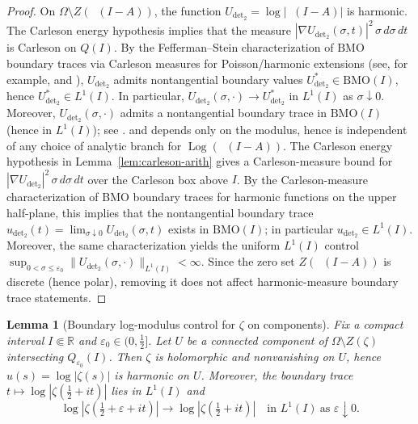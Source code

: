 \documentclass[11pt]{amsart}
\newtheorem{lemma}[theorem]{Lemma}
\theoremstyle{definition}
\theoremstyle{remark}
\DeclareMathOperator{\dettwo}{det_2}
\begin{document}
\begin{proof}
On $\Omega\setminus Z(\dettwo(I-A))$, the function $U_{\det_2}=\log|\dettwo(I-A)|$ is harmonic.
The Carleson energy hypothesis implies that the measure $|\nabla U_{\det_2}(\sigma,t)|^2\,\sigma\,d\sigma\,dt$ is Carleson on $Q(I)$.
By the Fefferman--Stein characterization of $\mathrm{BMO}$ boundary traces via Carleson measures for Poisson/harmonic extensions (see, for example, \cite[Ch.~IV, Thm.~3, p.~159]{SteinHA} and \cite[Ch.~VI, Thm.~3.4]{GarnettBAF}), $U_{\det_2}$ admits nontangential boundary values $U_{\det_2}^*\in\mathrm{BMO}(I)$, hence $U_{\det_2}^*\in L^1(I)$.
In particular, $U_{\det_2}(\sigma,\cdot)\to U_{\det_2}^*$ in $L^1(I)$ as $\sigma\downarrow 0$.
Moreover, $U_{\det_2}(\sigma,\cdot)$ admits a nontangential boundary trace in $\mathrm{BMO}(I)$ (hence in $L^1(I)$); see \cite{SteinHA,GarnettBAF}.
 and depends only on the modulus, hence is independent of any choice of analytic branch for $\operatorname{Log}(\dettwo(I-A))$.
The Carleson energy hypothesis in Lemma~\ref{lem:carleson-arith} gives a Carleson-measure bound for $|\nabla U_{\det_2}|^2\,\sigma\,d\sigma\,dt$ over the Carleson box above $I$.
By the Carleson-measure characterization of BMO boundary traces for harmonic functions on the upper half-plane, this implies that the nontangential boundary trace
$u_{\det_2}(t)=\lim_{\sigma\downarrow 0}U_{\det_2}(\sigma,t)$ exists in $\mathrm{BMO}(I)$; in particular $u_{\det_2}\in L^1(I)$.
Moreover, the same characterization yields the uniform $L^1(I)$ control
\(
\sup_{0<\sigma\le\varepsilon_0}\|U_{\det_2}(\sigma,\cdot)\|_{L^1(I)}<\infty.
\)
Since the zero set $Z(\dettwo(I-A))$ is discrete (hence polar), removing it does not affect harmonic-measure boundary trace statements.
\end{proof}
\begin{lemma}[Boundary log-modulus control for $\zeta$ on components]\label{lem:zeta-logL1-components}
Fix a compact interval $I\Subset\mathbb R$ and $\varepsilon_0\in(0,\tfrac12]$.
Let $U$ be a connected component of $\Omega\setminus Z(\zeta)$ intersecting $Q_{\varepsilon_0}(I)$.
Then $\zeta$ is holomorphic and nonvanishing on $U$, hence $u(s)=\log|\zeta(s)|$ is harmonic on $U$.
Moreover, the boundary trace $t\mapsto \log|\zeta(\tfrac12+it)|$ lies in $L^1(I)$ and
\[
\log|\zeta(\tfrac12+\varepsilon+it)|\to \log|\zeta(\tfrac12+it)| \quad\text{in }L^1(I)\ \text{as }\varepsilon\downarrow0.
\]
\end{lemma}
\end{document}
